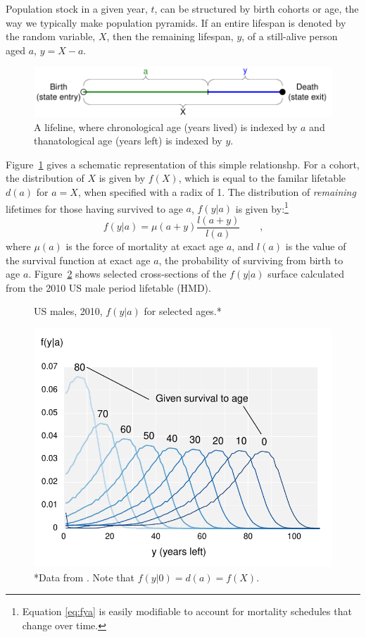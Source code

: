 \documentclass{article}
\newcommand{\tc}{\quad\quad\text{,}}
\begin{document}
Population stock in a given year, $t$, can be structured by birth
cohorts or age, the way we typically make population pyramids. If an entire
lifespan is denoted by the random variable, $X$, then the remaining lifespan,
$y$, of a still-alive person aged $a$, $y = X - a$. 
\begin{figure}[h]
\centering
	\caption{A lifeline, where chronological age (years lived) is indexed by $a$
	and thanatological age (years left) is indexed by $y$.}
	\label{fig:line}
	\includegraphics[scale=.8]{Figures/LifeLine.pdf}	
\end{figure}
Figure~\ref{fig:line} gives a schematic representation of this simple
relationshp. For a cohort, the
distribution of $X$ is given by $f(X)$, which is equal to the familar lifetable
$d(a)$ for $a = X$, when specified with a radix of 1. The distribution of
\textit{remaining} lifetimes for those having survived to age $a$, $f(y|a)$ is
given by:\footnote{Equation \eqref{eq:fya} is easily modifiable to account for
mortality schedules that change over time.}
\begin{equation}
\label{eq:fya}
f(y|a) = \mu(a+y) \frac{l(a+y)}{l(a)} \tc
\end{equation}
where $\mu(a)$ is the force of mortality at exact age $a$, and $l(a)$ is
the value of the survival function at exact age $a$, the probability of
surviving from birth to age $a$. Figure~\ref{fig:fya} shows selected
cross-sections of the $f(y|a)$ surface calculated from the 2010 US male period lifetable (HMD). 
\begin{figure}[h]
\centering
	\caption{US males, 2010, $f(y|a)$ for selected ages.*}
	\label{fig:fya}
	\includegraphics[scale=.8]{Figures/fya.pdf}	
	\caption*{*Data from . Note that $f(y|0) = d(a) = f(X)$.}
\end{figure}
\end{document}
